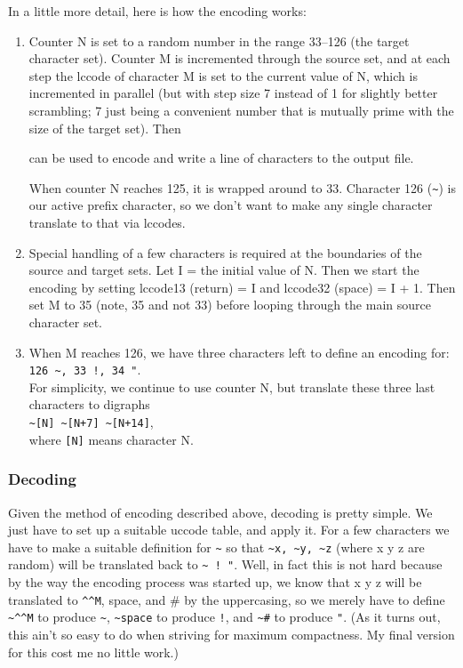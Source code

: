 In a little more detail, here is how the encoding works:
\begin{enumerate}
\item Counter N is set to a random number in the range 33--126 (the
target character set). Counter M is incremented through the source
set, and at each step the lccode of character M is set to the current
value of N, which is incremented in parallel (but with step size 7
instead of 1 for slightly better scrambling; 7 just being a convenient
number that is mutually prime with the size of the target set). Then
can be used to encode and write a line of characters to the output file.

When counter N reaches 125, it is wrapped around to 33. Character 126
(\verb?~?) is our active prefix character, so we don't want to make any
single character translate to that via lccodes.

\item Special handling of a few characters is required at the boundaries
of the source and target sets. Let I = the initial value of N. Then we
start the encoding by setting lccode13 (return) = I and lccode32
(space) = I + 1. Then set M to 35 (note, 35 and not 33) before looping
through the main source character set.

\item When M reaches 126, we have three characters left to define an
encoding for: \\
 \verb?126 ~, 33 !, 34 "?. \\
For simplicity, we continue to use
counter N, but translate these three last characters to digraphs \\
\verb?~[N] ~[N+7] ~[N+14]?, \\
 where \verb?[N]? means character N.

\end{enumerate}

\subsubsection{Decoding}

Given the method of encoding described above, decoding is pretty simple.
We just have to set up a suitable uccode table, and apply it. For a few
characters we have to make a suitable definition for \verb?~? so that
\verb?~x, ~y, ~z? (where x y z are random) will be translated back to 
\verb?~ ! "?. Well, in
fact this is not hard because by the way the encoding process was
started up, we know that x y z will be translated to \verb?^^M?, space, and \#
by the uppercasing, so we merely have to define \verb?~^^M? to produce 
\verb?~?,
\verb?~space? to produce \verb?!?, and \verb?~#? to produce \verb?"?. 
(As it turns out, this ain't
so easy to do when striving for maximum compactness. My final version
for this cost me no little work.)

